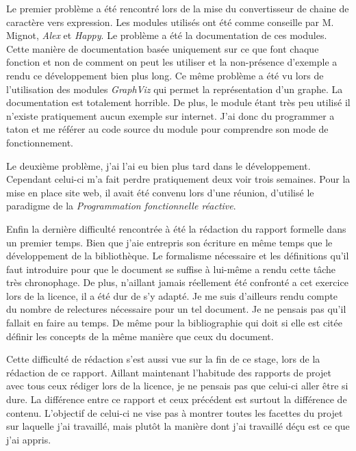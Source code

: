 \vphantom{}

Le premier problème a été rencontré lors de la mise du convertisseur de chaine 
de caractère vers expression. Les modules utilisés ont été comme conseille par 
M. Mignot, \textit{Alex} et \textit{Happy}. Le problème a été la documentation 
de ces modules. Cette manière de documentation basée uniquement sur ce que font 
chaque fonction et non de comment on peut les utiliser et la non-présence 
d'exemple a rendu ce développement bien plus long. Ce même problème a été vu 
lors de l'utilisation des modules \textit{GraphViz} qui permet la représentation
d'un graphe. La documentation est totalement horrible. De plus, le module étant 
très peu utilisé il n'existe pratiquement aucun exemple sur internet. J'ai donc
du programmer a taton et me référer au code source du module pour comprendre 
son mode de fonctionnement.

\vphantom{}

Le deuxième problème, j'ai l'ai eu bien plus tard dans le développement. 
Cependant celui-ci m’a fait perdre pratiquement deux voir trois semaines. Pour 
la mise en place site web, il avait été convenu lors d'une réunion, d'utilisé 
le paradigme de la \textit{Programmation fonctionnelle réactive}. 

\vphantom{}

Enfin la dernière difficulté rencontrée à été la rédaction du rapport formelle 
dans un premier temps. Bien que j'aie entrepris son écriture en même temps que 
le développement de la bibliothèque. Le formalisme nécessaire et les définitions 
qu'il faut introduire pour que le document se suffise à lui-même a rendu cette 
tâche très chronophage. De plus, n'aillant jamais réellement été confronté a 
cet exercice lors de la licence, il a été dur de s'y adapté. Je me suis 
d'ailleurs rendu compte du nombre de relectures nécessaire pour un tel document. 
Je ne pensais pas qu'il fallait en faire au temps. De même pour la bibliographie 
qui doit si elle est citée définir les concepts de la même manière que ceux 
du document.

Cette difficulté de rédaction s'est aussi vue sur la fin de ce stage, lors de la 
rédaction de ce rapport. Aillant maintenant l'habitude des rapports de projet 
avec tous ceux rédiger lors de la licence, je ne pensais pas que celui-ci aller 
être si dure. La différence entre ce rapport et ceux précédent est surtout la 
différence de contenu. L'objectif de celui-ci ne vise pas à montrer toutes les 
facettes du projet sur laquelle j'ai travaillé, mais plutôt la manière dont j'ai 
travaillé déçu est ce que j'ai appris. 

